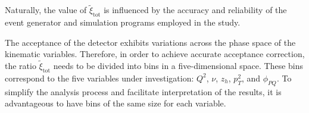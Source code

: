     Naturally, the value of $\tilde\xi_\text{tot}$ is influenced by the accuracy and reliability of the event generator and simulation programs employed in the study.

    The acceptance of the detector exhibits variations across the phase space of the kinematic variables.
    Therefore, in order to achieve accurate acceptance correction, the ratio $\tilde\xi_\text{tot}$ needs to be divided into bins in a five-dimensional space.
    These bins correspond to the five variables under investigation: $Q^2$, $\nu$, $z_h$, $p_T^2$, and $\phi_{PQ}$.
    To simplify the analysis process and facilitate interpretation of the results, it is advantageous to have bins of the same size for each variable.

    \pagebreak

